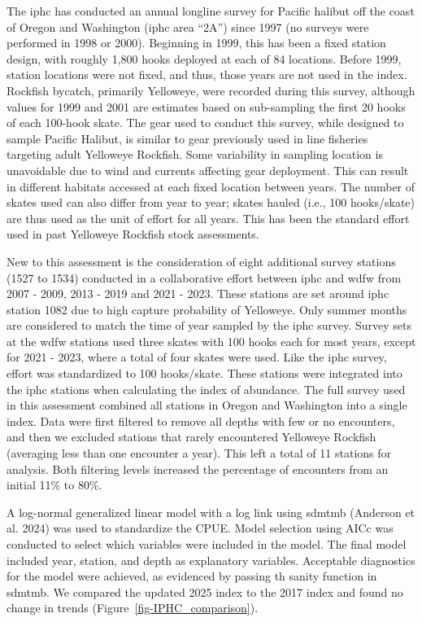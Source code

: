 \documentclass[
]{scrartcl}
\begin{document}
The \gls{iphc} has conducted an annual longline survey for Pacific
halibut off the coast of Oregon and Washington (\gls{iphc} area ``2A'')
since 1997 (no surveys were performed in 1998 or 2000). Beginning in
1999, this has been a fixed station design, with roughly 1,800 hooks
deployed at each of 84 locations. Before 1999, station locations were
not fixed, and thus, those years are not used in the index. Rockfish
bycatch, primarily Yelloweye, were recorded during this survey, although
values for 1999 and 2001 are estimates based on sub-sampling the first
20 hooks of each 100-hook skate. The gear used to conduct this survey,
while designed to sample Pacific Halibut, is similar to gear previously
used in line fisheries targeting adult Yelloweye Rockfish. Some
variability in sampling location is unavoidable due to wind and currents
affecting gear deployment. This can result in different habitats
accessed at each fixed location between years. The number of skates used
can also differ from year to year; skates hauled (i.e., 100 hooks/skate)
are thus used as the unit of effort for all years. This has been the
standard effort used in past Yelloweye Rockfish stock assessments.

New to this assessment is the consideration of eight additional survey
stations (1527 to 1534) conducted in a collaborative effort between
\gls{iphc} and \gls{wdfw} from 2007 - 2009, 2013 - 2019 and 2021 - 2023.
These stations are set around \gls{iphc} station 1082 due to high
capture probability of Yelloweye. Only summer months are considered to
match the time of year sampled by the \gls{iphc} survey. Survey sets at
the \gls{wdfw} stations used three skates with 100 hooks each for most
years, except for 2021 - 2023, where a total of four skates were used.
Like the \gls{iphc} survey, effort was standardized to 100 hooks/skate.
These stations were integrated into the \gls{iphc} stations when
calculating the index of abundance. The full survey used in this
assessment combined all stations in Oregon and Washington into a single
index. Data were first filtered to remove all depths with few or no
encounters, and then we excluded stations that rarely encountered
Yelloweye Rockfish (averaging less than one encounter a year). This left
a total of 11 stations for analysis. Both filtering levels increased the
percentage of encounters from an initial 11\% to 80\%.

A log-normal generalized linear model with a log link using \gls{sdmtmb}
(Anderson et al. 2024) was used to standardize the CPUE. Model selection
using AICc was conducted to select which variables were included in the
model. The final model included year, station, and depth as explanatory
variables. Acceptable diagnostics for the model were achieved, as
evidenced by passing th sanity function in \gls{sdmtmb}. We compared the
updated 2025 index to the 2017 index and found no change in trends
(Figure~\ref{fig-IPHC_comparison}).
\end{document}
